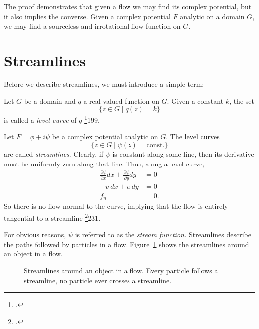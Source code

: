 \documentclass[letterpaper, twoside, 12 pt]{article}
\begin{document}
	\begin{remark}
		The proof demonstrates that given a flow we may find its complex potential, but it also implies the converse.
		Given a complex potential $F$ analytic on a domain $G$, we may find a sourceless and irrotational flow function on $G$.
	\end{remark}



\section{Streamlines} %
\label{sec:streamlines}

	Before we describe streamlines, we must introduce a simple term:\
	\begin{definition}
		Let $G$ be a domain and $q$ a real-valued function on $G$.
		Given a constant $k$, the set 
		\[
			\{ z \in G \mid q(z) = k \}
		\]
		is called a \textit{level curve} of $q$ \footcite{fisher}{199}.
	\end{definition}

	\begin{definition}[Streamlines]
		Let $F = \phi + i \psi$ be a complex potential analytic on $G$.
		The level curves
		\[
			\{ z \in G \mid \psi(z) = \mathrm{const.} \}
		\]
		are called \textit{streamlines}.
		Clearly, if $\psi$ is constant along some line, then its derivative must be uniformly zero along that line.
		Thus, along a level curve,
		\begin{align*}
			\frac{\partial \psi}{\partial x}dx + \frac{\partial \psi}{\partial y}dy &= 0 \\
			-v\> dx  + u\> dy &= 0 \\
			f_n &= 0.
		\end{align*}
		So there is no flow normal to the curve, implying that the flow is entirely tangential to a streamline \footcite{silverman}{231}.
	\end{definition}
	\begin{remark}
		For obvious reasons, $\psi$ is referred to as the \textit{stream function.}
		Streamlines describe the paths followed by particles in a flow. 
		Figure~\ref{fig:streamlines} shows the streamlines around an object in a flow.
	\end{remark}

	\begin{figure}[H]
		\centering
		\begin{tikzpicture}
			
		\end{tikzpicture}
		\captionsetup{width = 0.5 \textwidth}
		\caption{
			Streamlines around an object in a flow.
			Every particle follows a streamline, no particle ever crosses a streamline.
		}
		\label{fig:streamlines}
	\end{figure}
\end{document}

